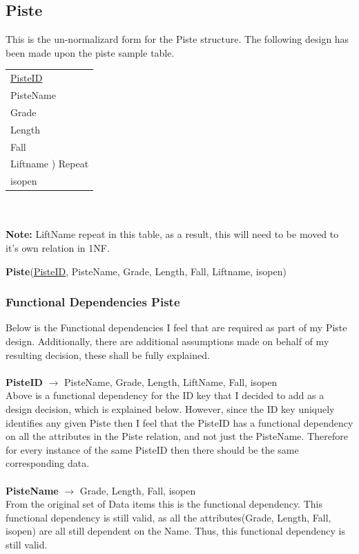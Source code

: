 \documentclass[12pt]{article}
\begin{document}
\subsection{Piste}
\vspace{0.4cm}
This is the un-normalizard form for the Piste structure. The following design has been made upon the piste sample table.
\newline \newline
{\setlength{\extrarowheight}{10pt}
\begin{tabular}{|l|}
\hline
	\uline{PisteID}\\
	PisteName \\
	Grade  \\
	Length\\
	Fall\\
	Liftname ) Repeat\\
	isopen\\
\hline
\end{tabular}} ~\\ \\
\textbf{Note:}  LiftName repeat in this table, as a result, this will need to be moved to it's own relation in 1NF.~\\
\par{\textbf{Piste}(\uline{PisteID}, PisteName, Grade, Length, Fall, Liftname, isopen)}
\subsubsection{Functional Dependencies Piste}
Below is the Functional dependencies I feel that are required as part of my Piste design. Additionally, there are additional assumptions made on behalf of my resulting decision, these shall be fully explained.\\\\
\-\hspace{1.8cm}
\textbf{PisteID} $\rightarrow$ PisteName, Grade, Length, LiftName, Fall, isopen~\\
\noindent Above is a functional dependency for the ID key that I decided to add as a design decision, which is explained below. However, since the ID key uniquely identifies any given Piste then I feel that the PisteID has a functional dependency on all the attributes in the Piste relation, and not just the PisteName. Therefore for every instance of the same PisteID then there should be the same corresponding data.
~\\\\
\-\hspace{1.8cm}
\textbf{PisteName} $\rightarrow$ Grade, Length, Fall, isopen~\\
From the original set of Data items this is the functional dependency. This functional dependency is still valid, as all the attributes(Grade, Length, Fall, isopen) are all still dependent on the Name. Thus, this functional dependency is still valid.
\end{document}
